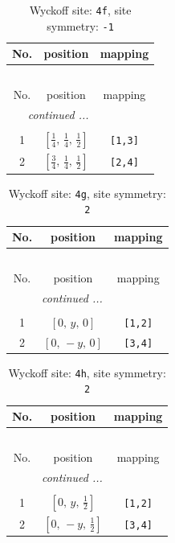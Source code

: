 \documentclass[fleqn,8pt]{jsarticle}
\begin{document}
\renewcommand{\arraystretch}{1.2}
\begin{longtable}{ccc}
\caption{Wyckoff site: {\tt 4f}, site symmetry: {\tt -1}}
 \\
 \hline \hline
No. & position & mapping \\ \hline \endfirsthead

\multicolumn{2}{l}{\tablename\ \thetable{}} \\
 \hline \hline
No. & position & mapping \\ \hline \endhead

 \hline \hline
\multicolumn{2}{r}{\footnotesize\it continued ...} \\ \endfoot

 \hline \hline
\multicolumn{2}{r}{} \\ \endlastfoot

1 & $\left[ \frac{1}{4},\, \frac{1}{4},\, \frac{1}{2} \right]$ & {\tt [1,3]} \\ \hline
2 & $\left[ \frac{3}{4},\, \frac{1}{4},\, \frac{1}{2} \right]$ & {\tt [2,4]} \\
\end{longtable}
\renewcommand{\arraystretch}{1.2}
\begin{longtable}{ccc}
\caption{Wyckoff site: {\tt 4g}, site symmetry: {\tt 2}}
 \\
 \hline \hline
No. & position & mapping \\ \hline \endfirsthead

\multicolumn{2}{l}{\tablename\ \thetable{}} \\
 \hline \hline
No. & position & mapping \\ \hline \endhead

 \hline \hline
\multicolumn{2}{r}{\footnotesize\it continued ...} \\ \endfoot

 \hline \hline
\multicolumn{2}{r}{} \\ \endlastfoot

1 & $\left[ 0,\, y,\, 0 \right]$ & {\tt [1,2]} \\ \hline
2 & $\left[ 0,\, - y,\, 0 \right]$ & {\tt [3,4]} \\
\end{longtable}
\renewcommand{\arraystretch}{1.2}
\begin{longtable}{ccc}
\caption{Wyckoff site: {\tt 4h}, site symmetry: {\tt 2}}
 \\
 \hline \hline
No. & position & mapping \\ \hline \endfirsthead

\multicolumn{2}{l}{\tablename\ \thetable{}} \\
 \hline \hline
No. & position & mapping \\ \hline \endhead

 \hline \hline
\multicolumn{2}{r}{\footnotesize\it continued ...} \\ \endfoot

 \hline \hline
\multicolumn{2}{r}{} \\ \endlastfoot

1 & $\left[ 0,\, y,\, \frac{1}{2} \right]$ & {\tt [1,2]} \\ \hline
2 & $\left[ 0,\, - y,\, \frac{1}{2} \right]$ & {\tt [3,4]} \\
\end{longtable}
\end{document}

